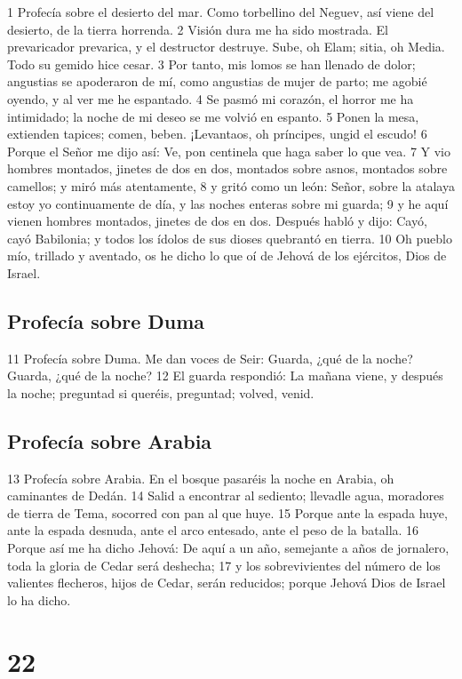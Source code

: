 1 Profecía sobre el desierto del mar. Como torbellino del Neguev, así viene del desierto, de la tierra horrenda.
2 Visión dura me ha sido mostrada. El prevaricador prevarica, y el destructor destruye. Sube, oh Elam; sitia, oh Media. Todo su gemido hice cesar.
3 Por tanto, mis lomos se han llenado de dolor; angustias se apoderaron de mí, como angustias de mujer de parto; me agobié oyendo, y al ver me he espantado.
4 Se pasmó mi corazón, el horror me ha intimidado; la noche de mi deseo se me volvió en espanto.
5 Ponen la mesa, extienden tapices; comen, beben. ¡Levantaos, oh príncipes, ungid el escudo!
6 Porque el Señor me dijo así: Ve, pon centinela que haga saber lo que vea.
7 Y vio hombres montados, jinetes de dos en dos, montados sobre asnos, montados sobre camellos; y miró más atentamente,
8 y gritó como un león: Señor, sobre la atalaya estoy yo continuamente de día, y las noches enteras sobre mi guarda;
9 y he aquí vienen hombres montados, jinetes de dos en dos. Después habló y dijo: Cayó, cayó Babilonia; y todos los ídolos de sus dioses quebrantó en tierra.
10 Oh pueblo mío, trillado y aventado, os he dicho lo que oí de Jehová de los ejércitos, Dios de Israel.

\section*{Profecía sobre Duma}

11 Profecía sobre Duma. Me dan voces de Seir: Guarda, ¿qué de la noche? Guarda, ¿qué de la noche?
12 El guarda respondió: La mañana viene, y después la noche; preguntad si queréis, preguntad; volved, venid.

\section*{Profecía sobre Arabia}

13 Profecía sobre Arabia. En el bosque pasaréis la noche en Arabia, oh caminantes de Dedán.
14 Salid a encontrar al sediento; llevadle agua, moradores de tierra de Tema, socorred con pan al que huye.
15 Porque ante la espada huye, ante la espada desnuda, ante el arco entesado, ante el peso de la batalla.
16 Porque así me ha dicho Jehová: De aquí a un año, semejante a años de jornalero, toda la gloria de Cedar será deshecha;
17 y los sobrevivientes del número de los valientes flecheros, hijos de Cedar, serán reducidos; porque Jehová Dios de Israel lo ha dicho.

\chapter{22}

